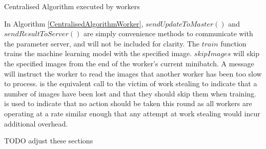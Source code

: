 \documentclass[12pt]{article}
\begin{document}
\IncMargin{1em}
\begin{algorithm}[H]
 \BlankLine
 \BlankLine
 \BlankLine
 \setcounter{AlgoLine}{0}
 \BlankLine
 \BlankLine
 \BlankLine
 \setcounter{AlgoLine}{0}
 \BlankLine
 \BlankLine
 \BlankLine
 \setcounter{AlgoLine}{0}
 \BlankLine
 \caption{Centralised Algorithm executed by workers}
 \label{CentralisedAlgorithmWorker}
\end{algorithm}
\DecMargin{1em}
\medskip

In Algorithm \ref{CentralisedAlgorithmWorker}, $sendUpdateToMaster()$ and $sendResultToServer()$ are simply convenience methods to communicate with the parameter server, and will not be included for clarity. The $train$ function trains the machine learning model with the specified image. $skipImages$ will skip the specified images from the end of the worker's current minibatch. A  message will instruct the worker to read the images that another worker has been too slow to process.  is the equivalent call to the victim of work stealing to indicate that a number of images have been lost and that they should skip them when training.  is used to indicate that no action should be taken this round as all workers are operating at a rate similar enough that any attempt at work stealing would incur additional overhead.

TODO adjust these sections
\end{document}
